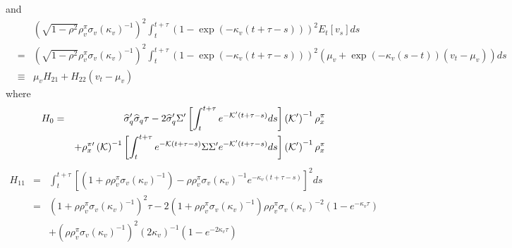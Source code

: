 \documentclass{article}
\begin{document}
and%
\begin{eqnarray*}
&&\left( \sqrt{1-\rho ^{2}}\rho _{v}^{\pi }\sigma _{v}\left( \kappa
_{v}\right) ^{-1}\right) ^{2}\int_{t}^{t+\tau }\left( 1-\exp \left( -\kappa
_{v}\left( t+\tau -s\right) \right) \right) ^{2}E_{t}\left[ v_{s}\right] ds
\\
&=&\left( \sqrt{1-\rho ^{2}}\rho _{v}^{\pi }\sigma _{v}\left( \kappa
_{v}\right) ^{-1}\right) ^{2}\int_{t}^{t+\tau }\left( 1-\exp \left( -\kappa
_{v}\left( t+\tau -s\right) \right) \right) ^{2}\left( \mu _{v}+\exp \left(
-\kappa _{v}\left( s-t\right) \right) \left( v_{t}-\mu _{v}\right) \right) ds
\\
&\equiv &\mu _{v}H_{21}+H_{22}\left( v_{t}-\mu _{v}\right)
\end{eqnarray*}%
where%
\begin{eqnarray*}
H_{0} &=&\widehat{\sigma }_{q}^{\prime }\widehat{\sigma }_{q}\tau -2\widehat{%
\sigma }_{q}^{\prime }\Sigma ^{\prime }\left[ \int_{t}^{t+\tau }e^{-\mathcal{%
K}^{\prime }\left( t+\tau -s\right) }ds\right] \left( \mathcal{K}^{\prime
}\right) ^{-1}\rho _{x}^{\pi } \\
&&+\rho _{x}^{\pi \prime }\left( \mathcal{K}\right) ^{-1}\left[
\int_{t}^{t+\tau }e^{-\mathcal{K}\left( t+\tau -s\right) }\Sigma \Sigma
^{\prime }e^{-\mathcal{K}^{\prime }\left( t+\tau -s\right) }ds\right] \left( 
\mathcal{K}^{\prime }\right) ^{-1}\rho _{x}^{\pi }
\end{eqnarray*}%
\begin{eqnarray*}
H_{11} &=&\int_{t}^{t+\tau }\left[ \left( 1+\rho \rho _{v}^{\pi }\sigma
_{v}\left( \kappa _{v}\right) ^{-1}\right) -\rho \rho _{v}^{\pi }\sigma
_{v}\left( \kappa _{v}\right) ^{-1}e^{-\kappa _{v}\left( t+\tau -s\right) }%
\right] ^{2}ds \\
&=&\left( 1+\rho \rho _{v}^{\pi }\sigma _{v}\left( \kappa _{v}\right)
^{-1}\right) ^{2}\tau -2\left( 1+\rho \rho _{v}^{\pi }\sigma _{v}\left(
\kappa _{v}\right) ^{-1}\right) \rho \rho _{v}^{\pi }\sigma _{v}\left(
\kappa _{v}\right) ^{-2}\left( 1-e^{-\kappa _{v}\tau }\right) \\
&&+\left( \rho \rho _{v}^{\pi }\sigma _{v}\left( \kappa _{v}\right)
^{-1}\right) ^{2}\left( 2\kappa _{v}\right) ^{-1}\left( 1-e^{-2\kappa
_{v}\tau }\right)
\end{eqnarray*}%
\end{document}
